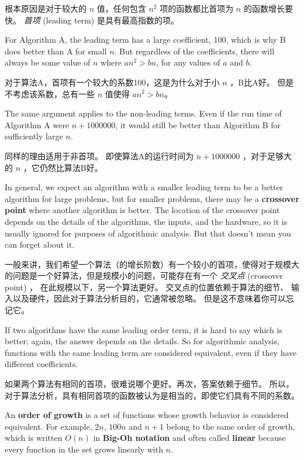 根本原因是对于较大的 $n$ 值，任何包含 $n^2$ 项的函数都比首项为 $n$ 的函数增长要快。
{\em 首项} (leading term) 是具有最高指数的项。
  

For Algorithm A, the leading term has a large coefficient, 100, which
is why B does better than A for small $n$.  But regardless of the
coefficients, there will always be some value of $n$ where
$a n^2 > b n$, for any values of $a$ and $b$.

对于算法A，首项有一个较大的系数100，这是为什么对于小 $n$ ，B比A好。
但是不考虑该系数，总有一些 $n$ 值使得 $a n^2 > b n$。

The same argument applies to the non-leading terms.  Even if the run
time of Algorithm A were $n+1000000$, it would still be better than
Algorithm B for sufficiently large $n$.

同样的理由适用于非首项。
即使算法A的运行时间为 $n+1000000$ ，对于足够大的 $n$ ，它仍然比算法B好。

In general, we expect an algorithm with a smaller leading term to be a
better algorithm for large problems, but for smaller problems, there
may be a {\bf crossover point} where another algorithm is better.  The
location of the crossover point depends on the details of the
algorithms, the inputs, and the hardware, so it is usually ignored for
purposes of algorithmic analysis.  But that doesn't mean you can forget
about it.

一般来讲，我们希望一个算法（的增长阶数）有一个较小的首项，使得对于规模大的问题是一个好算法，但是规模小的问题，可能存在有一个 {\em 交叉点} (crossover point) ， 在此规模以下，另一个算法更好。  交叉点的位置依赖于算法的细节、 输入以及硬件，因此对于算法分析目的，它通常被忽略。
但是这不意味着你可以忘记它。

If two algorithms have the same leading order term, it is hard to say
which is better; again, the answer depends on the details.  So for
algorithmic analysis, functions with the same leading term
are considered equivalent, even if they have different coefficients.

如果两个算法有相同的首项，很难说哪个更好。再次，答案依赖于细节。
所以，对于算法分析，具有相同首项的函数被认为是相当的，即使它们具有不同的系数。

An {\bf order of growth} is a set of functions whose growth
behavior is considered equivalent.  For example, $2n$, $100n$ and $n+1$
belong to the same order of growth, which is written $O(n)$ in
{\bf Big-Oh notation} and often called {\bf linear} because every function
in the set grows linearly with $n$.

